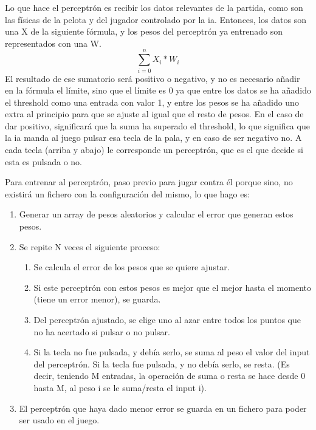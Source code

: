 Lo que hace el perceptrón es recibir los datos relevantes de la partida, como son las físicas de la pelota y del jugador controlado por la \gls{ia}. Entonces, los datos son una X de la siguiente fórmula, y los pesos del perceptrón ya entrenado son representados con una W.
\begin{equation}
	\sum_{i=0}^nX_{i}*W_{i}
\end{equation}
El resultado de ese sumatorio será positivo o negativo, y no es necesario añadir en la fórmula el límite, sino que el límite es 0 ya que entre los datos se ha añadido el threshold como una entrada con valor 1, y entre los pesos se ha añadido uno extra al principio para que se ajuste al igual que el resto de pesos. En el caso de dar positivo, significará que la suma ha superado el threshold, lo que significa que la \gls{ia} manda al juego pulsar esa tecla de la pala, y en caso de ser negativo no. A cada tecla (arriba y abajo) le corresponde un perceptrón, que es el que decide si esta es pulsada o no.

Para entrenar al perceptrón, paso previo para jugar contra él porque sino, no existirá un fichero con la configuración del mismo, lo que hago es:
\begin{enumerate}
	\item Generar un array de pesos aleatorios y calcular el error que generan estos pesos.
	\item Se repite N veces el siguiente proceso:
	\begin{enumerate}
		\item Se calcula el error de los pesos que se quiere ajustar.
		\item Si este perceptrón con estos pesos es mejor que el mejor hasta el momento (tiene un error menor), se guarda.
		\item Del perceptrón ajustado, se elige uno al azar entre todos los puntos que no ha acertado si pulsar o no pulsar. 
		\item Si la tecla no fue pulsada, y debía serlo, se suma al peso el valor del input del perceptrón. Si la tecla fue pulsada, y no debía serlo, se resta. (Es decir, teniendo M entradas, la operación de suma o resta se hace desde 0 hasta M, al peso i se le suma/resta el input i).
	\end{enumerate}
	\item El perceptrón que haya dado menor error se guarda en un fichero para poder ser usado en el juego.
\end{enumerate}

